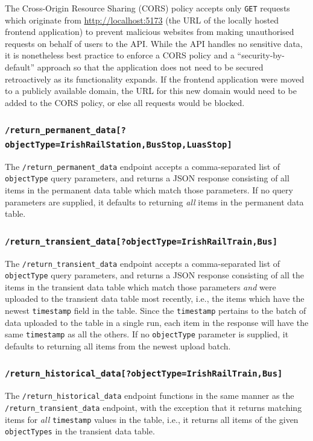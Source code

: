 \documentclass[a4paper,11pt]{report}
\begin{document}
The Cross-Origin Resource Sharing (CORS) policy accepts only \verb|GET| requests which originate from \url{http://localhost:5173} (the URL of the locally hosted frontend application) to prevent malicious websites from making unauthorised requests on behalf of users to the API.
While the API handles no sensitive data, it is nonetheless best practice to enforce a CORS policy and a ``security-by-default'' approach so that the application does not need to be secured retroactively as its functionality expands.
If the frontend application were moved to a publicly available domain, the URL for this new domain would need to be added to the CORS policy, or else all requests would be blocked.

\subsubsection{\texttt{/return\_permanent\_data[?objectType=IrishRailStation,BusStop,LuasStop]}}
The \verb|/return_permanent_data| endpoint accepts a comma-separated list of \verb|objectType| query parameters, and returns a JSON response consisting of all items in the permanent data table which match those parameters.
If no query parameters are supplied, it defaults to returning \textit{all} items in the permanent data table.

\subsubsection{\texttt{/return\_transient\_data[?objectType=IrishRailTrain,Bus]}}
The \verb|/return_transient_data| endpoint accepts a comma-separated list of \verb|objectType| query parameters, and returns a JSON response consisting of all the items in the transient data table which match those parameters \textit{and} were uploaded to the transient data table most recently, i.e., the items which have the newest \verb|timestamp| field in the table.
Since the \verb|timestamp| pertains to the batch of data uploaded to the table in a single run, each item in the response will have the same \verb|timestamp| as all the others.
If no \verb|objectType| parameter is supplied, it defaults to returning all items from the newest upload batch. 

\subsubsection{\texttt{/return\_historical\_data[?objectType=IrishRailTrain,Bus]}}
The \verb|/return_historical_data| endpoint functions in the same manner as the \verb|/return_transient_data| endpoint, with the exception that it returns matching items for \textit{all} \verb|timestamp| values in the table, i.e., it returns all items of the given \verb|objectTypes| in the transient data table. 
\end{document}
